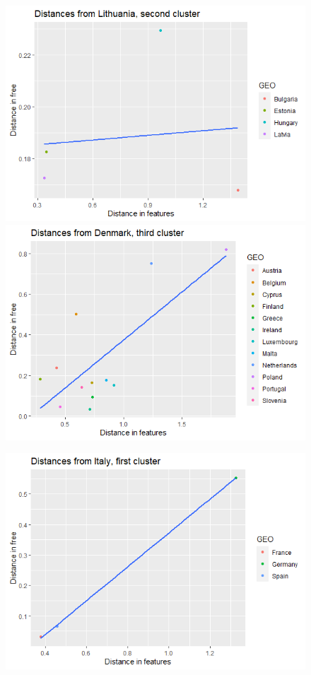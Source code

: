 \documentclass[a4paper,twoside,10pt]{article}
\begin{document}
\begin{figure}[H]
	\centering
	\includegraphics[width=0.8\linewidth]{"images/Distances from Lithuania"}
	\caption{}
	\label{fig:distances-from-lithuania}
	\includegraphics[width=0.8\linewidth]{"images/Distances from Denmark, third Cluster"}
	\caption{}
	\label{fig:distances-from-denmark-third-cluster}
\end{figure}
\begin{figure}[H]
	\centering
	\includegraphics[width=1\linewidth]{"images/Distances from Italy"}
	\caption{}
	\label{fig:distances-from-italy}
\end{figure}
\end{document}
